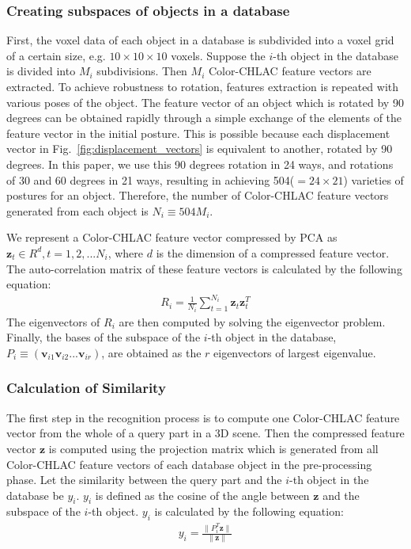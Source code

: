 \documentclass[conference]{sty/IEEEtran}
\begin{document}
\subsubsection{Creating subspaces of objects in a database}
First, the voxel data of each object in a database is subdivided into a voxel grid of a certain size,
    e.g. $10 \times 10 \times 10$ voxels.
Suppose the $i$-th object in the database is divided into $M_i$ subdivisions.
Then $M_i$ Color-CHLAC feature vectors are extracted.
To achieve robustness to rotation,
    features extraction is repeated with various poses of the object.
The feature vector of an object which is rotated by 90 degrees can be obtained rapidly
    through a simple exchange of the elements of the feature vector in the initial posture.
This is possible because each displacement vector in Fig.~\ref{fig:displacement_vectors}
    is equivalent to another, rotated by 90 degrees.
In this paper, we use this 90 degrees rotation in 24 ways,
    and rotations of 30 and 60 degrees in 21 ways,
    resulting in achieving 504($=24 \times 21$) varieties of postures for an object.
Therefore, the number of Color-CHLAC feature vectors
    generated from each object is $N_i \equiv 504M_i$.

We represent a Color-CHLAC feature vector compressed by PCA as $\bm{z}_t \in R^d, t=1,2,...N_i$,
    where $d$ is the dimension of a compressed feature vector.
The auto-correlation matrix of these feature vectors is calculated by the following equation:
\begin{eqnarray*}
  R_i = \frac{1}{N_i} \sum^{N_i}_{t=1} \bm{z}_t \bm{z}_t^T
\end{eqnarray*}
The eigenvectors of $R_i$ are then computed by solving the eigenvector problem.
Finally, the bases of the subspace of the $i$-th object in the database, $P_i \equiv (\bm{v}_{i1} \bm{v}_{i2} ... \bm{v}_{ir})$,
    are obtained as the $r$ eigenvectors of largest eigenvalue.

\subsubsection{Calculation of Similarity}
The first step in the recognition process is to compute
    one Color-CHLAC feature vector from the whole of a query part in a 3D scene. %
Then the compressed feature vector $\bm{z}$ is computed using the projection matrix which is
    generated from all Color-CHLAC feature vectors of each database object in the pre-processing phase.
Let the similarity between the query part and the $i$-th object in the database be $y_i$.
$y_i$ is defined as the cosine of the angle between $\bm{z}$ and the subspace of the $i$-th object.
$y_i$ is calculated by the following equation:
\begin{eqnarray}\label{eq:y_calc}
  y_i = \frac{\| P_i^T \bm{z} \|}{\| \bm{z} \|}
\end{eqnarray}
\end{document}
